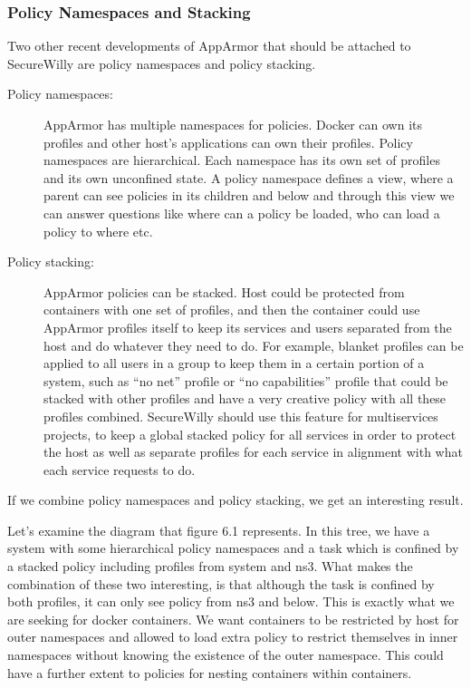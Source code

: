 \subsubsection{Policy Namespaces and Stacking}
Two other recent developments of AppArmor that should be attached to SecureWilly are policy namespaces and policy stacking. \cite{app3suse}
\begin{description}
\item[Policy namespaces:] AppArmor has multiple namespaces for policies. Docker can own its profiles and other host's applications can own their profiles. Policy namespaces are hierarchical.  Each namespace has its own set of profiles and its own unconfined state. A policy namespace defines a view, where a parent can see policies in its children and below and through this view we can answer questions like where can a policy be loaded, who can load a policy to where etc. 

\item[Policy stacking:] AppArmor policies can be stacked. Host could be protected from containers with one set of profiles, and then the container could use AppArmor profiles itself to keep its services and users separated from the host and do whatever they need to do. For example, blanket profiles can be applied to all users in a group to keep them in a certain portion of a system, such as “no net” profile or “no capabilities” profile that could be stacked with other profiles and have a very creative policy with all these profiles combined. SecureWilly should use this feature for multiservices projects, to keep a global stacked policy for all services in order to protect the host as well as separate profiles for each service in alignment with what each service requests to do.
\end{description}

If we combine policy namespaces and policy stacking, we get an interesting result.

Let's examine the diagram that figure 6.1 represents. In this tree, we have a system with some hierarchical policy namespaces and a task which is confined by a stacked policy including profiles from system and ns3. What makes the combination of these two interesting, is that although the task is confined by both profiles, it can only see policy from ns3 and below. This is exactly what we are seeking for docker containers. We want containers to be restricted by host for outer namespaces and allowed to load extra policy to restrict themselves in inner namespaces without knowing the existence of the outer namespace.
This could have a further extent to policies for nesting containers within containers.


